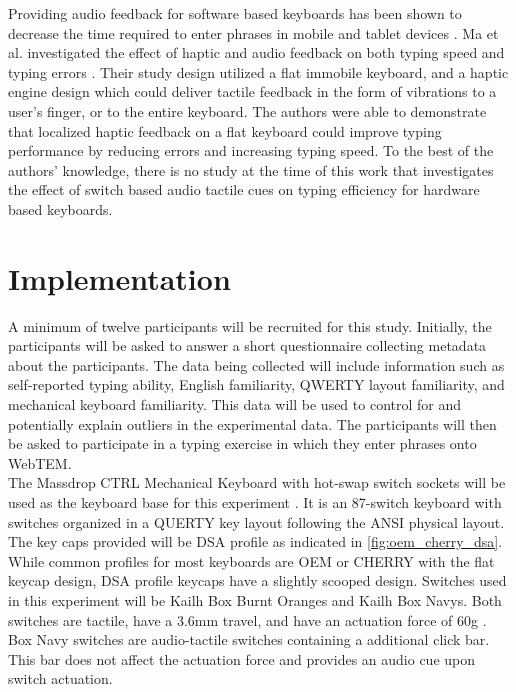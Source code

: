 \documentclass{sigchi}
\begin{document}
Providing audio feedback for software based keyboards has been shown to decrease the time required to enter phrases in mobile and tablet devices \cite{hoggan:2010, hoggan:2009}. Ma et al. investigated the effect of haptic and audio feedback on both typing speed and typing errors \cite{ma:2015}. Their study design utilized a flat immobile keyboard, and a haptic engine design which could deliver tactile feedback in the form of vibrations to a user's finger, or to the entire keyboard. The authors were able to demonstrate that localized haptic feedback on a flat keyboard could improve typing performance by reducing errors and increasing typing speed. To the best of the authors' knowledge, there is no study at the time of this work that investigates the effect of switch based audio tactile cues on typing efficiency for hardware based keyboards. \\

\section{Implementation}
A minimum of twelve participants will be recruited for this study. Initially, the participants will be asked to answer a short questionnaire collecting metadata about the participants. The data being collected will include information such as self-reported typing ability, English familiarity, QWERTY layout familiarity, and mechanical keyboard familiarity. This data will be used to control for and potentially explain outliers in the experimental data. The participants will then be asked to participate in a typing exercise in which they enter phrases onto WebTEM. \\

The Massdrop CTRL Mechanical Keyboard with hot-swap switch sockets will be used as the keyboard base for this experiment \cite{ctrl:keyboard}. It is an 87-switch keyboard with switches organized in a QUERTY key layout following the ANSI physical layout. The key caps provided will be DSA profile as indicated in \ref{fig:oem_cherry_dsa}. While common profiles for most keyboards are OEM or CHERRY with the flat keycap design, DSA profile keycaps have a slightly scooped design. Switches used in this experiment will be Kailh Box Burnt Oranges and Kailh Box Navys. Both switches are tactile, have a 3.6mm travel, and have an actuation force of 60g \cite{switch:navy, switch:orange}. Box Navy switches are audio-tactile switches containing a additional click bar. This bar does not affect the actuation force and provides an audio cue upon switch actuation. \\
\end{document}
